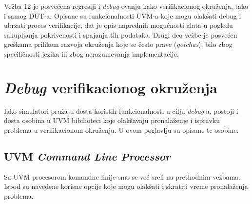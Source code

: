 %
% 

Vežba 12 je posvećena regresiji i \emph{debug}-ovanju kako verifikacionog
okruženja, tako i samog DUT-a. Opisane su funkcionalnosti UVM-a koje mogu
olakšati debug i ubrzati proces verifikacije, dat je opis naprednih mogućnosti
alata u pogledu sakupljanja pokrivenosti i spajanja tih podataka. Drugi deo
vežbe je posvećen greškama prilikom razvoja okruženja koje se često prave
(\emph{gotchas}), bilo zbog specifičnosti jezika ili zbog nerazumevanja
implementacije.


\section{\emph{Debug} verifikacionog okruženja}

Iako simulatori pružaju dosta koristih funkcionalnosti u cilju \emph{debug}-a,
postoji i dosta osobina u UVM bibilioteci koje olakšavaju pronalaženje i
ispravku problema u verifikacionom okruženju. U ovom poglavlju su opisane te
osobine.


\subsection{UVM \emph{Command Line Processor}}

Sa UVM procesorom komandne linije smo se već sreli na prethodnim vežbama. Ispod
su navedene korisne opcije koje mogu olakšati i skratiti vreme pronalaženja
problema.

